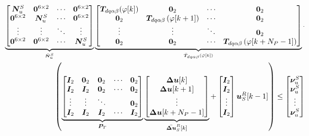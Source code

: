 \begin{align*}
\scriptstyle 
	\underbrace{
		\begin{bmatrix}
			\bm{N}_u^S & \bm{0}^{6 \times 2} & \cdots & \bm{0}^{6 \times 2} \\
			\bm{0}^{6 \times 2} & \bm{N}_u^S & \cdots & \bm{0}^{6 \times 2} \\
			\vdots & \vdots & \ddots & \vdots \\
			\bm{0}^{6 \times 2} & \bm{0}^{6 \times 2} & \cdots & \bm{N}_{u}^S
		\end{bmatrix}
	}_{\Bar{\bm{N}}_u^S}
	\underbrace{
		\begin{bmatrix}
			\bm{T}_{ d q \alpha \beta}(\varphi [k]) & \bm{0}_2  & \cdots &   \bm{0}_2 \\
			\bm{0}_2 & \bm{T}_{ d q \alpha \beta}\left(\varphi[k+1]\right)   &  \cdots &   \bm{0}_2 \\
			\vdots   & \vdots   & \ddots   & \bm{0}_2 \\
			\bm{0}_2 & \bm{0}_2 &  \cdots & \bm{T}_{ d q \alpha \beta}\left(\varphi[k+N_P-1]\right)   
		\end{bmatrix}
	}_{\Bar{\bm{T}}_{ d q \alpha \beta}(\Bar{\varphi} [k])}
	\cdot
	\\
	\left(
	\underbrace{
		\begin{bmatrix}
			\bm{I}_2 & \bm{0}_2 & \bm{0}_2 & \cdots & \bm{0}_2 \\
			\bm{I}_2 & \bm{I}_2 & \bm{0}_2 & \cdots & \bm{0}_2 \\
			\vdots   & \vdots   & \ddots   &  & \bm{0}_2 \\
			\bm{I}_2 & \bm{I}_2 & \bm{I}_2 & \cdots & \bm{I}_2
		\end{bmatrix}
	}_{\bm{P}_T}
	\underbrace{
		\begin{bmatrix}
			{ \boldsymbol{\Delta u}}[k] \\
			{ \boldsymbol{\Delta u}}[k+1]\\
			\vdots\\
			{ \boldsymbol{\Delta u}}[k+N_P-1]
		\end{bmatrix}
	}_{\Bar{\bm{\Delta u}}^R_S[k]}
	+
	\begin{bmatrix}
		\bm{I}_2 \\
		\bm{I}_2 \\
		\vdots\\
		\bm{I}_2
	\end{bmatrix}
	\bm{u}_S^R[k-1] 
	\right)
	\le
	\begin{bmatrix}
		\bm{\nu}^S_u \\
		\bm{\nu}^S_u \\
		\vdots\\
		\bm{\nu}^S_u \\
	\end{bmatrix}
	\label{equ:constaintU_full_SRF}
\end{align*}

